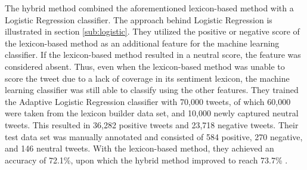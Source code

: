 The hybrid method combined the aforementioned lexicon-based method with a Logistic Regression classifier. The approach behind Logistic Regression is illustrated in section \ref{sub:logistic}. They utilized the positive or negative score of the lexicon-based method as an additional feature for the machine learning classifier. If the lexicon-based method resulted in a neutral score, the feature was considered absent. Thus, even when the lexicon-based method was unable to score the tweet due to a lack of coverage in its sentiment lexicon, the machine learning classifier was still able to classify using the other features. They trained the Adaptive Logistic Regression classifier with 70,000 tweets, of which 60,000 were taken from the lexicon builder data set, and 10,000 newly captured neutral tweets. This resulted in 36,282 positive tweets and 23,718 negative tweets. Their test data set was manually annotated and consisted of 584 positive, 270 negative, and 146 neutral tweets. With the lexicon-based method, they achieved an accuracy of 72.1\%, upon which the hybrid method improved to reach 73.7\% \cite{khuc}.










